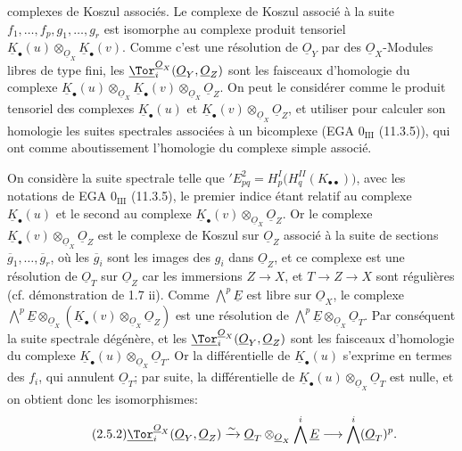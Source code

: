 
complexes de Koszul associés. Le complexe de Koszul associé à la suite \(f_1,\ldots,f_p,g_1,\ldots,g_r\) est isomorphe au complexe produit tensoriel \(\underline{K}_\bullet(u)\otimes_{\underline{O}_X}\underline{K}_\bullet(v)\). Comme c'est une résolution de \(\underline{O}_Y\) par des \(\underline{O}_X\)-Modules libres de type fini, les \(\underline{\Tor}_i^{\underline{O}_X}(\underline{O}_Y,\underline{O}_Z)\) sont les faisceaux d'homologie du complexe \(\underline{K}_\bullet(u)\otimes_{\underline{O}_X}\underline{K}_\bullet(v)\otimes_{\underline{O}_X}\underline{O}_Z\). On peut le considérer comme le produit tensoriel des complexes \(\underline{K}_\bullet(u)\) et \(\underline{K}_\bullet(v)\otimes_{\underline{O}_X}\underline{O}_Z\), et utiliser pour calculer son homologie les suites spectrales associées à un bicomplexe (EGA \(0_{\mathrm{III}}\) (11.3.5)), qui ont comme aboutissement l'homologie du complexe simple associé.

On considère la suite spectrale telle que \({}'E^2_{pq}=H^I_p\bigl(H^{II}_q(K_{\bullet\bullet})\bigr)\), avec les notations de EGA \(0_{\mathrm{III}}\) (11.3.5), le premier indice étant relatif au complexe \(\underline{K}_\bullet(u)\) et le second au complexe \(\underline{K}_\bullet(v)\otimes_{\underline{O}_X}\underline{O}_Z\). Or le complexe \(\underline{K}_\bullet(v)\otimes_{\underline{O}_X}\underline{O}_Z\) est le complexe de Koszul sur \(\underline{O}_Z\) associé à la suite de sections \(\overline g_1,\ldots,\overline g_r\), où les \(\overline g_i\) sont les images des \(g_i\) dans \(\underline{O}_Z\), et ce complexe est une résolution de \(\underline{O}_T\) sur \(\underline{O}_Z\) car les immersions \(Z\to X\), et \(T\to Z\to X\) sont régulières (cf. démonstration de 1.7 ii). Comme \(\bigwedge^p\underline{E}\) est libre sur \(\underline{O}_X\), le complexe \(\bigwedge^p\underline{E}\otimes_{\underline{O}_X}(\underline{K}_\bullet(v)\otimes_{\underline{O}_X}\underline{O}_Z)\) est une résolution de \(\bigwedge^p\underline{E}\otimes_{\underline{O}_X}\underline{O}_T\). Par conséquent la suite spectrale dégénère, et les \(\underline{\Tor}_i^{\underline{O}_X}(\underline{O}_Y,\underline{O}_Z)\) sont les faisceaux d'homologie du complexe \(\underline{K}_\bullet(u)\otimes_{\underline{O}_X}\underline{O}_T\). Or la différentielle de \(\underline{K}_\bullet(u)\) s'exprime en termes des \(f_i\), qui annulent \(\underline{O}_T\); par suite, la différentielle de \(\underline{K}_\bullet(u)\otimes_{\underline{O}_X}\underline{O}_T\) est nulle, et on obtient donc les isomorphismes:
\begin{equation}\tag{2.5.2}
\underline{\Tor}_i^{\underline{O}_X}(\underline{O}_Y,\underline{O}_Z)
\xrightarrow{\sim}
\underline{O}_T\otimes_{\underline{O}_X}\bigwedge^i\underline{E}
\longrightarrow
\bigwedge^i(\underline{O}_T)^p.
\end{equation}

